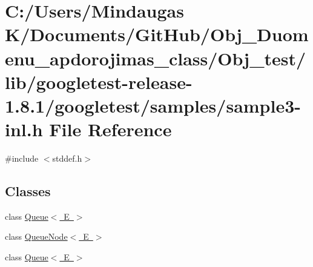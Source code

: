 \hypertarget{_obj__test_2lib_2googletest-release-1_88_81_2googletest_2samples_2sample3-inl_8h}{}\section{C\+:/\+Users/\+Mindaugas K/\+Documents/\+Git\+Hub/\+Obj\+\_\+\+Duomenu\+\_\+apdorojimas\+\_\+class/\+Obj\+\_\+test/lib/googletest-\/release-\/1.8.1/googletest/samples/sample3-\/inl.h File Reference}
\label{_obj__test_2lib_2googletest-release-1_88_81_2googletest_2samples_2sample3-inl_8h}
{\ttfamily \#include $<$stddef.\+h$>$}\newline
\subsection*{Classes}
\begin{DoxyCompactItemize}
\item 
class \mbox{\hyperlink{class_queue}{Queue$<$ E $>$}}
\item 
class \mbox{\hyperlink{class_queue_node}{Queue\+Node$<$ E $>$}}
\item 
class \mbox{\hyperlink{class_queue}{Queue$<$ E $>$}}
\end{DoxyCompactItemize}
